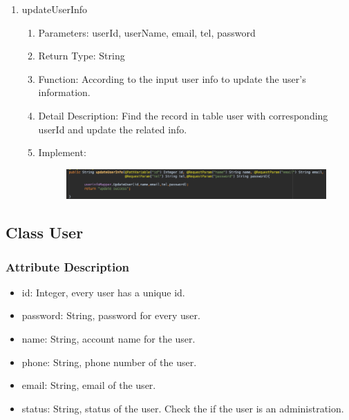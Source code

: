 \documentclass[16pt]{scrreprt}
\begin{document}
\begin{enumerate}
\begin{enumerate}
\begin{figure}[H]
\end{figure}
\end{enumerate}
	\item updateUserInfo
	\begin{enumerate}
		\item Parameters: userId, userName, email, tel, password
		\item Return Type: String
		\item Function: According to the input user info to update the user's information.
		\item Detail Description: Find the record in table user with corresponding userId and update the related info.
		\item Implement:
		\begin{figure}[H]
	\centering
	\includegraphics[width=1.\textwidth]{diagrams/updateinfofunc.png}\\
\end{figure}
	\end{enumerate}
\end{enumerate}

\subsection{Class User}
\subsubsection{Attribute Description}
\begin{itemize}
	\item id: Integer, every user has a unique id.
	\item password: String, password for every user.
	\item name: String, account name for the user.
	\item phone: String, phone number of the user.
	\item email: String, email of the user.
	\item status: String, status of the user. Check the if the user is an administration.
\end{itemize}
\end{document}
